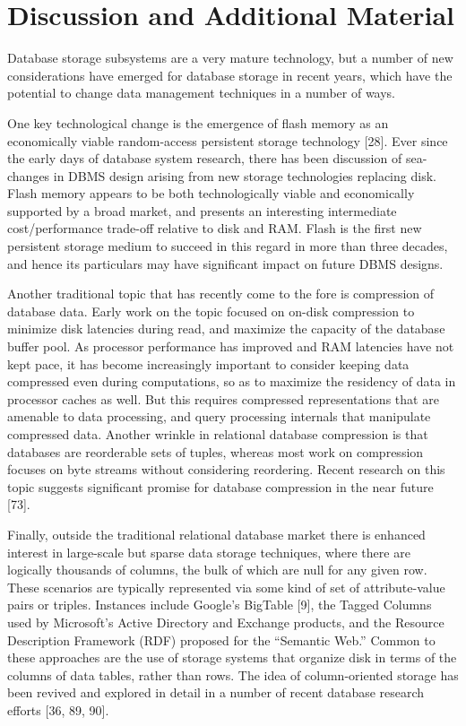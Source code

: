 \documentclass[a4paper,11pt,twoside,openright]{book}
\begin{document}
\hypertarget{discussion-and-additional-material-3}{%
\section{Discussion and Additional
Material}\label{discussion-and-additional-material-3}}

Database storage subsystems are a very mature technology, but a number
of new considerations have emerged for database storage in recent years,
which have the potential to change data management techniques in a
number of ways.

One key technological change is the emergence of flash memory as an
economically viable random-access persistent storage technology
{[}28{]}. Ever since the early days of database system research, there
has been discussion of sea-changes in DBMS design arising from new
storage technologies replacing disk. Flash memory appears to be both
technologically viable and economically supported by a broad market,
and presents an interesting intermediate cost/performance trade-off
relative to disk and RAM. Flash is the first new persistent storage
medium to succeed in this regard in more than three decades, and hence
its particulars may have significant impact on future DBMS designs.

Another traditional topic that has recently come to the fore is
compression of database data. Early work on the topic focused on
on-disk compression to minimize disk latencies during read, and maximize
the capacity of the database buffer pool. As processor performance has
improved and RAM latencies have not kept pace, it has become
increasingly important to consider keeping data compressed even during
computations, so as to maximize the residency of data in processor
caches as well. But this requires compressed representations that are
amenable to data processing, and query processing internals that
manipulate compressed data. Another wrinkle in relational database
compression is that databases are reorderable sets of tuples, whereas
most work on compression focuses on byte streams without considering
reordering. Recent research on this topic suggests significant promise
for database compression in the near future {[}73{]}.

Finally, outside the traditional relational database market there is
enhanced interest in large-scale but sparse data storage techniques,
where there are logically thousands of columns, the bulk of which are
null for any given row. These scenarios are typically represented via
some kind of set of attribute-value pairs or triples. Instances include
Google's BigTable {[}9{]}, the Tagged Columns used by Microsoft's Active
Directory and Exchange products, and the Resource Description Framework
(RDF) proposed for the ``Semantic Web.'' Common to these approaches are
the use of storage systems that organize disk in terms of the columns of
data tables, rather than rows. The idea of column-oriented storage has
been revived and explored in detail in a number of recent database
research efforts {[}36, 89, 90{]}.
\end{document}
